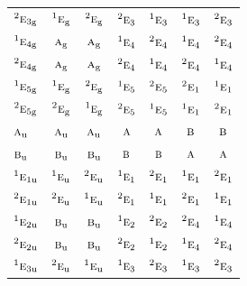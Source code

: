 \documentclass[10pt,a4paper]{article}
\numberwithin{equation}{section}
\newcommand{\irr}[1]{\text{\normalfont\scshape #1}}
\newcommand{\conjpair}[1]{{}^{#1}}
\newcommand{\ptag}[1]{\mathrm{#1}}
\begin{document}
{\begin{longtable}{@{}lcccccc@{}}
$\conjpair{2}\irr{e}_{3\ptag{g}}$ & $\conjpair{1}\irr{e}_{\ptag{g}}$ & $\conjpair{2}\irr{e}_{\ptag{g}}$ & $\conjpair{2}\irr{e}_{3}$ & $\conjpair{1}\irr{e}_{3}$ & $\conjpair{1}\irr{e}_{3}$ & $\conjpair{2}\irr{e}_{3}$\\
$\conjpair{1}\irr{e}_{4\ptag{g}}$ & $\irr{a}_{\ptag{g}}$ & $\irr{a}_{\ptag{g}}$ & $\conjpair{1}\irr{e}_{4}$ & $\conjpair{2}\irr{e}_{4}$ & $\conjpair{1}\irr{e}_{4}$ & $\conjpair{2}\irr{e}_{4}$\\
$\conjpair{2}\irr{e}_{4\ptag{g}}$ & $\irr{a}_{\ptag{g}}$ & $\irr{a}_{\ptag{g}}$ & $\conjpair{2}\irr{e}_{4}$ & $\conjpair{1}\irr{e}_{4}$ & $\conjpair{2}\irr{e}_{4}$ & $\conjpair{1}\irr{e}_{4}$\\
$\conjpair{1}\irr{e}_{5\ptag{g}}$ & $\conjpair{1}\irr{e}_{\ptag{g}}$ & $\conjpair{2}\irr{e}_{\ptag{g}}$ & $\conjpair{1}\irr{e}_{5}$ & $\conjpair{2}\irr{e}_{5}$ & $\conjpair{2}\irr{e}_{1}$ & $\conjpair{1}\irr{e}_{1}$\\
$\conjpair{2}\irr{e}_{5\ptag{g}}$ & $\conjpair{2}\irr{e}_{\ptag{g}}$ & $\conjpair{1}\irr{e}_{\ptag{g}}$ & $\conjpair{2}\irr{e}_{5}$ & $\conjpair{1}\irr{e}_{5}$ & $\conjpair{1}\irr{e}_{1}$ & $\conjpair{2}\irr{e}_{1}$\\
$\irr{a}_{\ptag{u}}$ & $\irr{a}_{\ptag{u}}$ & $\irr{a}_{\ptag{u}}$ & $\irr{a}$ & $\irr{a}$ & $\irr{b}$ & $\irr{b}$\\
$\irr{b}_{\ptag{u}}$ & $\irr{b}_{\ptag{u}}$ & $\irr{b}_{\ptag{u}}$ & $\irr{b}$ & $\irr{b}$ & $\irr{a}$ & $\irr{a}$\\
$\conjpair{1}\irr{e}_{1\ptag{u}}$ & $\conjpair{1}\irr{e}_{\ptag{u}}$ & $\conjpair{2}\irr{e}_{\ptag{u}}$ & $\conjpair{1}\irr{e}_{1}$ & $\conjpair{2}\irr{e}_{1}$ & $\conjpair{1}\irr{e}_{1}$ & $\conjpair{2}\irr{e}_{1}$\\
$\conjpair{2}\irr{e}_{1\ptag{u}}$ & $\conjpair{2}\irr{e}_{\ptag{u}}$ & $\conjpair{1}\irr{e}_{\ptag{u}}$ & $\conjpair{2}\irr{e}_{1}$ & $\conjpair{1}\irr{e}_{1}$ & $\conjpair{2}\irr{e}_{1}$ & $\conjpair{1}\irr{e}_{1}$\\
$\conjpair{1}\irr{e}_{2\ptag{u}}$ & $\irr{b}_{\ptag{u}}$ & $\irr{b}_{\ptag{u}}$ & $\conjpair{1}\irr{e}_{2}$ & $\conjpair{2}\irr{e}_{2}$ & $\conjpair{2}\irr{e}_{4}$ & $\conjpair{1}\irr{e}_{4}$\\
$\conjpair{2}\irr{e}_{2\ptag{u}}$ & $\irr{b}_{\ptag{u}}$ & $\irr{b}_{\ptag{u}}$ & $\conjpair{2}\irr{e}_{2}$ & $\conjpair{1}\irr{e}_{2}$ & $\conjpair{1}\irr{e}_{4}$ & $\conjpair{2}\irr{e}_{4}$\\
$\conjpair{1}\irr{e}_{3\ptag{u}}$ & $\conjpair{2}\irr{e}_{\ptag{u}}$ & $\conjpair{1}\irr{e}_{\ptag{u}}$ & $\conjpair{1}\irr{e}_{3}$ & $\conjpair{2}\irr{e}_{3}$ & $\conjpair{1}\irr{e}_{3}$ & $\conjpair{2}\irr{e}_{3}$\\

\end{longtable}}
\end{document}
